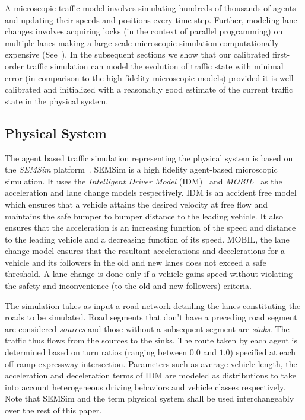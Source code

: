 \documentclass{wscpaperproc}
\theoremstyle{wsc}
\begin{document}
A microscopic traffic model involves simulating hundreds of thousands of agents and updating their speeds and positions every time-step. Further, modeling lane changes involves acquiring locks (in the context of parallel programming) on multiple lanes making a large scale microscopic simulation computationally expensive (See~\cite{aydt2013multi}). In the subsequent sections we show that our calibrated first-order traffic simulation can model the evolution of traffic state with minimal error (in comparison to the high fidelity microscopic models) provided it is well calibrated and initialized with a reasonably good estimate of the current traffic state in the physical system. 

\subsection{Physical System}

The agent based traffic simulation representing the physical system is based on the {\it SEMSim} platform~. SEMSim is a high fidelity agent-based microscopic simulation. It uses the {\it Intelligent Driver Model} (IDM)~ and {\it MOBIL}~ as the acceleration and lane change models respectively. IDM is an accident free model which ensures that a vehicle attains the desired velocity at free flow and maintains the safe bumper to bumper distance to the leading vehicle. It also ensures that the acceleration is an increasing function of the speed and distance to the leading vehicle and a decreasing function of its speed. MOBIL, the lane change model ensures that the resultant accelerations and decelerations for a vehicle and its followers in the old and new lanes does not exceed a safe threshold. A lane change is done only if a vehicle gains speed without violating the safety and inconvenience (to the old and new followers) criteria.


The simulation takes as input a road network detailing the lanes constituting the roads to be simulated. Road segments that don't have a preceding road segment are considered {\it sources} and those without a subsequent segment are {\it sinks}. The traffic thus flows from the sources to the sinks. The route taken by each agent is determined  based on turn ratios (ranging between $0.0$ and $1.0$) specified at each off-ramp expressway intersection. Parameters such as average vehicle length, the acceleration and deceleration terms of IDM are modeled as distributions to take into account heterogeneous driving behaviors and vehicle classes respectively. Note that SEMSim and the term physical system shall be used interchangeably over the rest of this paper.
\end{document}
